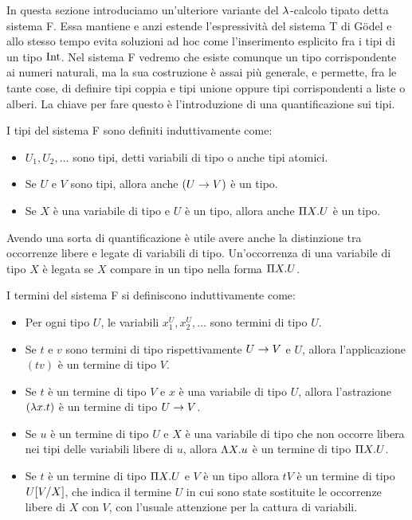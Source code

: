 \documentclass[]{marticle}
\begin{document}
In questa sezione introduciamo un'ulteriore variante del $\l$-calcolo tipato
detta sistema F. Essa mantiene e anzi estende l'espressivit\`a del sistema T di
G\"odel e allo stesso tempo evita soluzioni ad hoc come l'inserimento esplicito
fra i tipi di un tipo $\tint$. Nel sistema F vedremo che esiste comunque un tipo
corrispondente ai numeri naturali, ma la sua costruzione \`e assai pi\`u
generale, e permette, fra le tante cose, di definire tipi coppia e tipi unione
oppure tipi corrispondenti a liste o alberi. La chiave per fare questo \`e
l'introduzione di una quantificazione sui tipi.

\begin{block}[Definizione]
    I tipi del sistema F sono definiti induttivamente come:
    \begin{itemize}
        \item $U_1, U_2, \dots$ sono tipi, detti variabili di tipo o anche tipi
            atomici.
        \item Se $U$ e $V$ sono tipi, allora anche $(U\rar V)$ \`e un tipo.
        \item Se $X$ \`e una variabile di tipo e $U$ \`e un tipo, allora anche
            $\P X. U$ \`e un tipo.
    \end{itemize}
\end{block}

Avendo una sorta di quantificazione \`e utile avere anche la distinzione tra
occorrenze libere e legate di variabili di tipo. Un'occorrenza di una variabile
di tipo $X$ \`e legata se $X$ compare in un tipo nella forma $\P X. U$.

\begin{block}[Definizione]
    I termini del sistema F si definiscono induttivamente come:
    \begin{itemize}
        \item Per ogni tipo $U$, le variabili $x^U_1, x^U_2, \dots$ sono termini
            di tipo $U$.
        \item Se $t$ e $v$ sono termini di tipo rispettivamente $U\rar V$ e $U$,
            allora l'applicazione $(tv)$ \`e un termine di tipo $V$.
        \item Se $t$ \`e un termine di tipo $V$ e $x$ \`e una variabile di tipo
            $U$, allora l'astrazione $(\l x.  t)$ \`e un termine di tipo $U\rar
            V$.
        \item Se $u$ \`e un termine di tipo $U$ e $X$ \`e una variabile di tipo
            che non occorre libera nei tipi delle variabili libere di $u$,
            allora $\L X. u$ \`e un termine di tipo $\P X.U$. 
        \item Se $t$ \`e un termine di tipo $\P X. U$ e $V$ \`e un tipo allora
            $tV$ \`e un termine di tipo $U\sub{V}{X}$, che indica il termine $U$
            in cui sono state sostituite le occorrenze libere di $X$ con $V$,
            con l'usuale attenzione per la cattura di variabili.
    \end{itemize}
\end{block}
\end{document}

